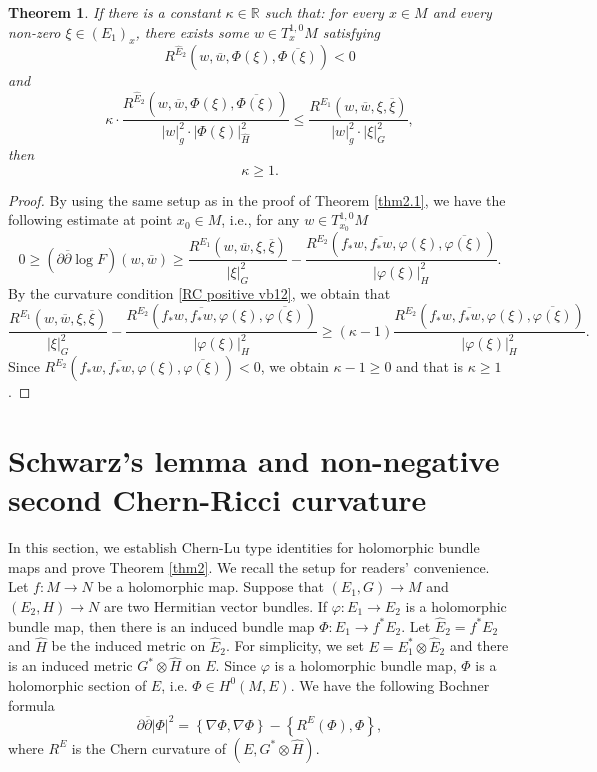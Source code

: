 \documentclass[12pt]{amsart}
\newcommand\bp{{\bar\partial}}
\theoremstyle{plain}
\newtheorem{thm}{Theorem}[section]
\theoremstyle{definition}
\newcommand{\btheorem}{\begin{thm}}
\newcommand{\etheorem}{\end{thm}}
\newcommand{\bproof}{\begin{proof}}
\newcommand{\eproof}{\end{proof}}
\newcommand{\p}{\partial}
\renewcommand{\bar}{\overline}
\renewcommand{\phi}{\varphi}
\newcommand{\beq}{\begin{equation}}
\newcommand{\eeq}{\end{equation}}
\renewcommand{\hat}{\widehat}
\renewcommand{\bp}{\bar{\partial}}
\newcommand{\ts}{\otimes}
\renewcommand{\>}{\rightarrow}
\newcommand{\R}{{\mathbb R}}
\numberwithin{equation}{section} %
\begin{document}
\btheorem\label{thm11}
If there is a constant $\kappa\in \R$ such that:  for every $x\in M$ and every non-zero $\xi\in (E_1)_x$,
there exists some $w\in T_x^{1,0}M$ satisfying
\beq  R^{\hat E_2}\left(w,\bar{w},\Phi(\xi),\bar{\Phi(\xi)}\right)
<0\label{RC positive vb11}
\eeq
and
\beq \kappa\cdot
\frac{R^{\hat E_2}\left(w,\bar{w},\Phi(\xi),\bar{\Phi(\xi)}\right)}{|w|^2_g\cdot  |\Phi(\xi)|^2_{\hat H}}\le \frac{R^{E_1}\left(w,\bar w,\xi,\bar \xi\right)}{|w|_g^2\cdot  |\xi|^2_G},\label{RC positive vb12}
\eeq
then  $$\kappa\geq 1.$$
\etheorem
\bproof  By using  the same setup as in the proof of Theorem \ref{thm2.1}, we have the following estimate at point $x_0\in M$, i.e.,  for any $w\in T_{x_0}^{1,0}M$
\beq
0 \ge \left(\p\bp\log F\right)(w,\bar w)
\ge \frac{R^{E_1}\left(w,\bar w,\xi,\bar \xi\right)}{|\xi|_G^2} -\frac{ R^{E_2}\left(f_*w,\bar{f_*w},\phi(\xi),\bar{\phi(\xi)}\right) }{|\phi(\xi)|^2_H}.
\eeq
By the curvature condition \eqref{RC positive vb12}, we obtain that
$$ \frac{R^{E_1}\left(w,\bar w,\xi,\bar \xi\right)}{|\xi|_G^2} -\frac{ R^{E_2}\left(f_*w,\bar{f_*w},\phi(\xi),\bar{\phi(\xi)}\right) }{|\phi(\xi)|^2_H} \geq (\kappa-1)\frac{ R^{E_2}\left(f_*w,\bar{f_*w},\phi(\xi),\bar{\phi(\xi)}\right) }{|\phi(\xi)|^2_H}. $$
Since $ R^{E_2}\left(f_*w,\bar{f_*w},\phi(\xi),\bar{\phi(\xi)}\right)<0$, we obtain $\kappa-1\geq 0$ and that is $\kappa\geq 1$. \eproof 



\baselineskip

\section{Schwarz's lemma  and non-negative second Chern-Ricci curvature}

In this section, we establish Chern-Lu type identities  for holomorphic bundle maps and prove Theorem \ref{thm2}. We recall the setup for readers' convenience.  Let $f:M\to N$ be a holomorphic map. Suppose that  $(E_1, G)\>M$ and $(E_2,H)\>N$ are two Hermitian  vector bundles.  If   $\phi:E_1\to E_2$ is a holomorphic bundle map, then there is an induced bundle map $\Phi: E_1\>f^*E_2$.
Let $\hat E_2=f^*E_2$ and  $\hat H$ be the induced metric on $\hat E_2$.   For simplicity, we set  $E=E_1^*\ts \hat E_2$ and there is an induced metric $G^*\ts \hat H$ on $E$.  Since $\phi$ is a holomorphic bundle map, $\Phi$ is a holomorphic section of $E$, i.e.  $\Phi\in H^0(M, E)$.  We have the following Bochner formula
\beq
\p\bp |\Phi|^2=\left\{ \nabla \Phi,\nabla\Phi\right\}-\left\{  R^E(\Phi),\Phi\right\}, \label{Bochner}
\eeq
where $R^E$ is the Chern curvature  of $(E, G^*\ts \hat H)$. \\
\end{document}
